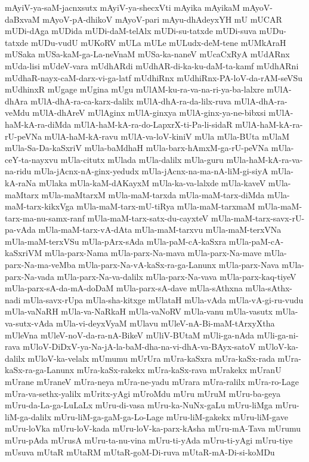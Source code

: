 {mAyiV-ya-saM-jacnxsutx
mAyiV-ya-shecxVti
mAyika
mAyikaM
mAyoV-daBxvaM
mAyoV-pA-dhikoV
mAyoV-pari
mAyu-dhAdeyxYH
mU
mUCAR
mUDi-dAga
mUDida
mUDi-daM-telAlx
mUDi-su-tatxde
mUDi-suva
mUDu-tatxde
mUDu-vudU
mUKoRV
mULa
mULe
mULudx-deM-tene
mUMkAraH
mUSaka
mUSa-kaM-ga-La-neVnaM
mUSa-ka-naneV
mUcaCxRyA
mUdARnx
mUda-lisi
mUdeV-vara
mUdhARdi
mUdhAR-di-ka-ku-daM-ta-kamf
mUdhARni
mUdhaR-nayx-caM-darx-vi-ga-latf
mUdhiRnx
mUdhiRnx-PA-loV-da-rAM-seVSu
mUdhinxR
mUgage
mUgina
mUgu
mUlAM-ku-ra-va-na-ri-ya-ba-lalxre
mUlA-dhAra
mUlA-dhA-ra-ca-karx-dalilx
mUlA-dhA-ra-da-lilx-ruva
mUlA-dhA-ra-veMdu
mUlA-dhAreV
mUlAginx
mUlA-ginxya
mUlA-ginx-ya-ne-bibxsi
mUlA-haM-kA-ra-diMda
mUlA-haM-kA-ra-do-LapxrX-ti-Pa-li-sidaR
mUlA-haM-kA-ra-rU-peVNa
mUlA-haM-kA-ravu
mUlA-va-loV-kiniV
mUla
mUla-BUta
mUlaM
mUla-Sa-Da-kaSxriV
mUla-baMdhaH
mUla-barx-hAmxM-ga-rU-peVNa
mUla-ceY-ta-nayxvu
mUla-citutx
mUlada
mUla-dalilx
mUla-guru
mUla-haM-kA-ra-va-na-ridu
mUla-jAcnx-nA-ginx-yedudx
mUla-jAcnx-na-ma-nA-liM-gi-siyA
mUla-kA-raNa
mUlaka
mUla-kaM-dAKayxM
mUla-ka-va-lalxde
mUla-kaveV
mUla-maMtarx
mUla-maMtarxM
mUla-maM-tarxda
mUla-maM-tarx-diMda
mUla-maM-tarx-kikxVga
mUla-maM-tarx-mU-tiRya
mUla-maM-tarxmaM
mUla-maM-tarx-ma-nu-samx-ranf
mUla-maM-tarx-satx-du-cayxteV
mUla-maM-tarx-savx-rU-pa-vAda
mUla-maM-tarx-vA-dAta
mUla-maM-tarxvu
mUla-maM-terxVNa
mUla-maM-terxVSu
mUla-pArx-sAda
mUla-paM-cA-kaSxra
mUla-paM-cA-kaSxriVM
mUla-parx-Nama
mUla-parx-Na-mava
mUla-parx-Na-mave
mUla-parx-Na-ma-veMba
mUla-parx-Na-vA-kaSx-ra-ga-Lanunx
mUla-parx-Nava
mUla-parx-Na-vada
mUla-parx-Na-va-dalilx
mUla-parx-Na-vava
mUla-parx-kaq-tiyeV
mUla-parx-sA-da-mA-doDaM
mUla-parx-sA-dave
mUla-sAthxna
mUla-sAthx-nadi
mUla-savx-rUpa
mUla-sha-kitxge
mUlataH
mUla-vAda
mUla-vA-gi-ru-vudu
mUla-vaNaRH
mUla-va-NaRkaH
mUla-vaNoRV
mUla-vanu
mUla-vasutx
mUla-va-sutx-vAda
mUla-vi-deyxVyaM
mUlavu
mUleV-nA-Bi-maM-tArxyXtha
mUleVna
mUleV-noV-da-ra-nA-BikeV
mUliV-BUtaM
mUli-ga-nAda
mUli-ga-ni-rava
mUloV-DiDxV-ya-Na-jA-la-baM-dha-na-vi-dhA-va-BAyx-satoV
mUloV-ka-dalilx
mUloV-ka-velalx
mUmumu
mUrUra
mUra-kaSxra
mUra-kaSx-rada
mUra-kaSx-ra-ga-Lanunx
mUra-kaSx-rakekx
mUra-kaSx-rava
mUrakekx
mUranU
mUrane
mUraneV
mUra-neya
mUra-ne-yadu
mUrara
mUra-ralilx
mUra-ro-Lage
mUra-va-sethx-yalilx
mUritx-yAgi
mUroMdu
mUru
mUruM
mUru-ba-geya
mUru-da-La-ga-LuLaLx
mUru-di-vasa
mUru-ka-NuNx-gaLu
mUru-liMga
mUru-liM-ga-dalilx
mUru-liM-ga-gaM-ga-Lo-Lage
mUru-liM-gakekx
mUru-liM-gave
mUru-loVka
mUru-loV-kada
mUru-loV-ka-parx-kAsha
mUru-mA-Tava
mUrumu
mUru-pAda
mUrusA
mUru-ta-nu-vina
mUru-ti-yAda
mUru-ti-yAgi
mUru-tiye
mUsuva
mUtaR
mUtaRM
mUtaR-goM-Di-ruva
mUtaR-mA-Di-si-koMDu
}
